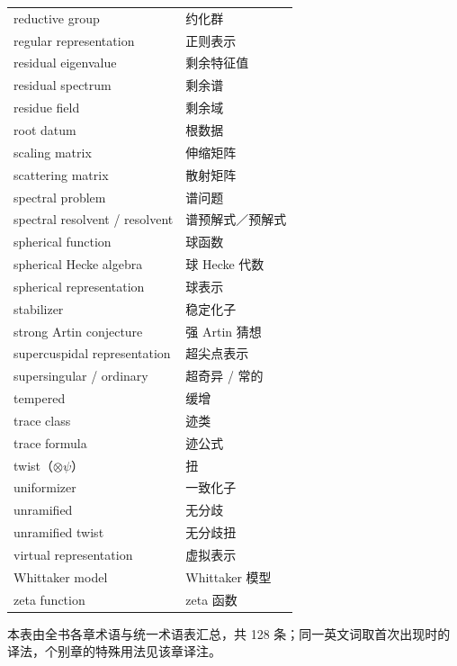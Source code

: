 {\begin{longtable}{@{}p{}p{}@{}}
reductive group & 约化群 \\
regular representation & 正则表示 \\
residual eigenvalue & 剩余特征值 \\
residual spectrum & 剩余谱 \\
residue field & 剩余域 \\
root datum & 根数据 \\
scaling matrix & 伸缩矩阵 \\
scattering matrix & 散射矩阵 \\
spectral problem & 谱问题 \\
spectral resolvent / resolvent & 谱预解式／预解式 \\
spherical function & 球函数 \\
spherical Hecke algebra & 球 Hecke 代数 \\
spherical representation & 球表示 \\
stabilizer & 稳定化子 \\
strong Artin conjecture & 强 Artin 猜想 \\
supercuspidal representation & 超尖点表示 \\
supersingular / ordinary & 超奇异 / 常的 \\
tempered & 缓增 \\
trace class & 迹类 \\
trace formula & 迹公式 \\
twist（$\otimes\psi$） & 扭 \\
uniformizer & 一致化子 \\
unramified & 无分歧 \\
unramified twist & 无分歧扭 \\
virtual representation & 虚拟表示 \\
Whittaker model & Whittaker 模型 \\
zeta function & zeta 函数 \\
\end{longtable}}
\vspace{0.6em}
\noindent\footnotesize 本表由全书各章术语与统一术语表汇总，共 128 条；同一英文词取首次出现时的译法，个别章的特殊用法见该章译注。\normalsize
